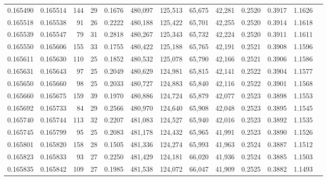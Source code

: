 \begin{tabular}{rrrrrrrrrrrrr}
0.165490 & 0.165514 &   144 &  29 &                                     0.1676 & 480,097 & 125,513 &  65,675 &  42,281 & 0.2520 & 0.3917 & 1.1626 \\
0.165518 & 0.165538 &    91 &  26 &                                     0.2222 & 480,188 & 125,422 &  65,701 &  42,255 & 0.2520 & 0.3914 & 1.1618 \\
0.165539 & 0.165547 &    79 &  31 &                                     0.2818 & 480,267 & 125,343 &  65,732 &  42,224 & 0.2520 & 0.3911 & 1.1611 \\
0.165550 & 0.165606 &   155 &  33 &                                     0.1755 & 480,422 & 125,188 &  65,765 &  42,191 & 0.2521 & 0.3908 & 1.1596 \\
0.165611 & 0.165630 &   110 &  25 &                                     0.1852 & 480,532 & 125,078 &  65,790 &  42,166 & 0.2521 & 0.3906 & 1.1586 \\
0.165631 & 0.165643 &    97 &  25 &                                     0.2049 & 480,629 & 124,981 &  65,815 &  42,141 & 0.2522 & 0.3904 & 1.1577 \\
0.165650 & 0.165660 &    98 &  25 &                                     0.2033 & 480,727 & 124,883 &  65,840 &  42,116 & 0.2522 & 0.3901 & 1.1568 \\
0.165660 & 0.165675 &   159 &  39 &                                     0.1970 & 480,886 & 124,724 &  65,879 &  42,077 & 0.2523 & 0.3898 & 1.1553 \\
0.165692 & 0.165733 &    84 &  29 &                                     0.2566 & 480,970 & 124,640 &  65,908 &  42,048 & 0.2523 & 0.3895 & 1.1545 \\
0.165740 & 0.165744 &   113 &  32 &                                     0.2207 & 481,083 & 124,527 &  65,940 &  42,016 & 0.2523 & 0.3892 & 1.1535 \\
0.165745 & 0.165799 &    95 &  25 &                                     0.2083 & 481,178 & 124,432 &  65,965 &  41,991 & 0.2523 & 0.3890 & 1.1526 \\
0.165801 & 0.165820 &   158 &  28 &                                     0.1505 & 481,336 & 124,274 &  65,993 &  41,963 & 0.2524 & 0.3887 & 1.1512 \\
0.165823 & 0.165833 &    93 &  27 &                                     0.2250 & 481,429 & 124,181 &  66,020 &  41,936 & 0.2524 & 0.3885 & 1.1503 \\
0.165835 & 0.165842 &   109 &  27 &                                     0.1985 & 481,538 & 124,072 &  66,047 &  41,909 & 0.2525 & 0.3882 & 1.1493 \\

\end{tabular}
